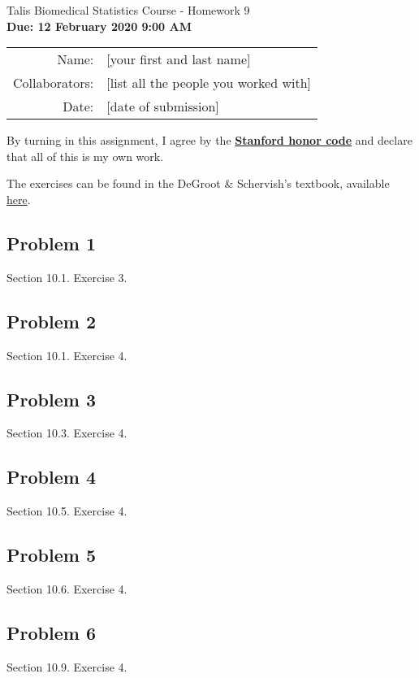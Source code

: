 \documentclass[12pt]{article}\usepackage[]{graphicx}\usepackage[]{color}
\begin{document}
\begin{center}
{\Large Talis Biomedical Statistics Course - Homework 9} \\
{\small \textbf{Due: 12 February 2020 9:00 AM}}
\newline

\begin{tabular}{rl}
  Name: & [your first and last name] \\
  Collaborators: & [list all the people you worked with] \\
  Date: & [date of submission]
\end{tabular}
\end{center}

By turning in this assignment, I agree by the \textbf{\href{https://communitystandards.stanford.edu/policies-and-guidance/honor-code}{Stanford honor code}} and declare
that all of this is my own work. \\

\vspace{.2in}

The exercises can be found in the DeGroot \& Schervish's textbook, available
\textcolor{blue}{\href{http://professor.ufabc.edu.br/~nelson.faustino/Ensino/IPE2016/Livros/Morris\%20H\%20DeGroot_\%20Mark\%20J\%20Schervish-Probability\%20and\%20statistics-Pearson\%20Education\%20\%20(2012)\%20(1).pdf}{here}}.


\subsection*{Problem 1}

Section 10.1. Exercise 3. \\


\subsection*{Problem 2}

Section 10.1. Exercise 4. \\


\subsection*{Problem 3}

Section 10.3. Exercise 4. \\


\subsection*{Problem 4}

Section 10.5. Exercise 4. \\


\subsection*{Problem 5}

Section 10.6. Exercise 4. \\


\subsection*{Problem 6}

Section 10.9. Exercise 4. \\
\end{document}
